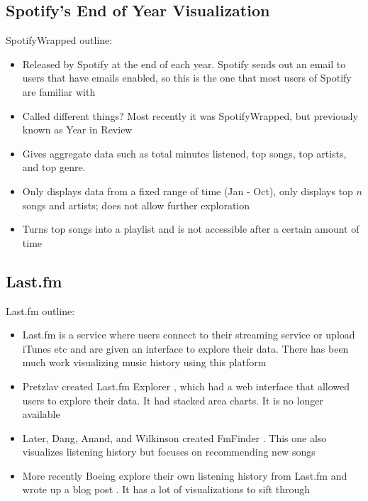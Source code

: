 \documentclass[journal]{vgtc}                %
\begin{document}
\subsection{Spotify's End of Year Visualization}

SpotifyWrapped outline:\cite{Spo18}
\begin{itemize}
  \item Released by Spotify at the end of each year. Spotify sends out an email to users that have emails enabled, so this is the one that most users of Spotify are familiar with
  \item Called different things? Most recently it was SpotifyWrapped, but previously known as Year in Review
  \item Gives aggregate data such as total minutes listened, top songs, top artists, and top genre.
  \item Only displays data from a fixed range of time (Jan - Oct), only displays top $n$ songs and artists; does not allow further exploration
  \item Turns top songs into a playlist and is not accessible after a certain amount of time
\end{itemize}

\subsection{Last.fm}

Last.fm outline:
\begin{itemize}
  \item Last.fm is a service where users connect to their streaming service or upload iTunes etc and are given an interface to explore their data. There has been much work visualizing music history using this platform
  \item Pretzlav created Last.fm Explorer \cite{Pre08}, which had a web interface that allowed users to explore their data. It had stacked area charts. It is no longer available
  \item Later, Dang, Anand, and Wilkinson created FmFinder \cite{Dan12} . This one also visualizes listening history but focuses on recommending new songs
  \item More recently Boeing explore their own listening history from Last.fm and wrote up a blog post \cite{Boe16}. It has a lot of visualizations to sift through 
\end{itemize}
\end{document}

